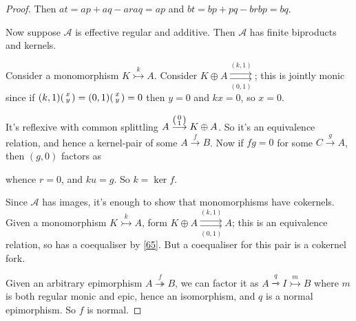 \documentclass[a4paper]{article}
\theoremstyle{definition}
\theoremstyle{remark}
\theoremstyle{default}
\numberwithin{definition}{section}
\newcommand*\parallelpair[2]{\overset{#1}{\underset{#2}{\rightrightarrows}}}
\newcommand*\col[2]{\begin{psmallmatrix}#1 \\ #2 \end{psmallmatrix}}
\begin{document}
\begin{proof}
	Then $at = ap+aq-araq = ap$ and $bt=bp+pq-brbp=bq$.
	
	Now suppose $\mathcal{A}$ is effective regular and additive.
	Then $\mathcal{A}$ has finite biproducts and kernels.
	
	Consider a monomorphism $K \overset{k}{\rightarrowtail} A$.
	Consider $K \oplus A \parallelpair{(k, 1)}{(0, 1)}$;
	this is jointly monic since if $(k, 1) \col{x}{y} = (0,1)\col{x}{y} = 0$ then $y=0$ and $kx=0$,
	so $x=0$.
	
	It's reflexive with common splittling $A \overset{\col{0}{1}}{\longrightarrow} K \oplus A$.
	So it's an equivalence relation,
	and hence a kernel-pair of some $A \overset{f}{\to} B$.
	Now if $fg=0$ for some $C \overset{g}{\to} A$,
	then $(g, 0)$ factors as
	\begin{center}
	\end{center}
	whence $r=0$, and $ku=g$.
	So $k=\ker f$.
	
	Since $\mathcal{A}$ has images,
	it's enough to show that monomorphisms have cokernels.
	Given a monomorphism $K \overset{k}{\rightarrowtail}{A}$,
	form $K \oplus A \parallelpair{(k, 1)}{(0, 1)} A$;
	this is an equivalence relation,
	so has a coequaliser by \ref{65}.
	But a coequaliser for this pair is a cokernel fork.
	
	Given an arbitrary epimorphism $A \overset{f}{\twoheadrightarrow} B$,
	we can factor it as $A \overset{q}{\rightarrowtriangle} I \overset{m}{\rightarrowtail} B$ where $m$ is both regular monic and epic,
	hence an isomorphism,
	and $q$ is a normal epimorphism.
	So $f$ is normal.
\end{proof}
\end{document}
